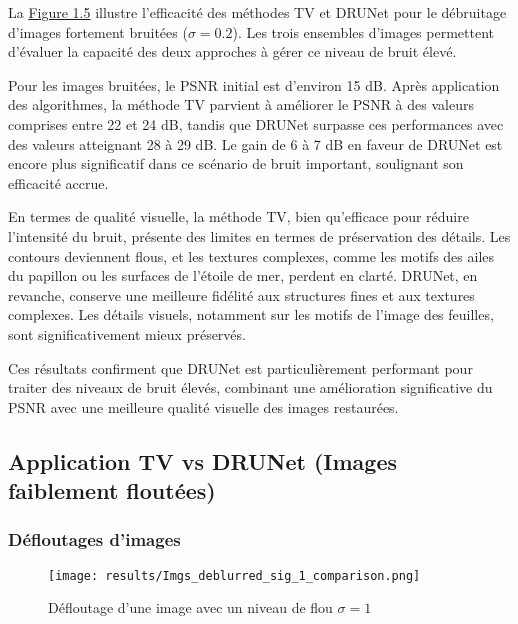 \documentclass[a4paper, 12pt]{report} %
\begin{document}
La \hyperref[fig:5]{Figure 1.5} illustre l’efficacité des méthodes TV et DRUNet pour le débruitage d’images fortement bruitées (\(\sigma = 0.2\)). Les trois ensembles d’images permettent d’évaluer la capacité des deux approches à gérer ce niveau de bruit élevé.

Pour les images bruitées, le PSNR initial est d’environ 15 dB. Après application des algorithmes, la méthode TV parvient à améliorer le PSNR à des valeurs comprises entre 22 et 24 dB, tandis que DRUNet surpasse ces performances avec des valeurs atteignant 28 à 29 dB. Le gain de 6 à 7 dB en faveur de DRUNet est encore plus significatif dans ce scénario de bruit important, soulignant son efficacité accrue.

En termes de qualité visuelle, la méthode TV, bien qu'efficace pour réduire l'intensité du bruit, présente des limites en termes de préservation des détails. Les contours deviennent flous, et les textures complexes, comme les motifs des ailes du papillon ou les surfaces de l’étoile de mer, perdent en clarté. DRUNet, en revanche, conserve une meilleure fidélité aux structures fines et aux textures complexes. Les détails visuels, notamment sur les motifs de l'image des feuilles, sont significativement mieux préservés.

Ces résultats confirment que DRUNet est particulièrement performant pour traiter des niveaux de bruit élevés, combinant une amélioration significative du PSNR avec une meilleure qualité visuelle des images restaurées.

\subsection{Application TV vs DRUNet (Images faiblement floutées)}

\subsubsection{Défloutages d'images}

\begin{figure}[H]
\centering
\begin{adjustbox}{width=0.985\linewidth, totalheight=0.47 \textheight, angle=0, scale= 0.9, minipage= 4.2\linewidth, margin= 0}
    \texttt{[image: results/Imgs\_deblurred\_sig\_1\_comparison.png]}
\end{adjustbox}
    \caption{ Défloutage d'une image avec un niveau de flou $\sigma = 1$}
    \label{fig:6}
\end{figure} 
\end{document}

